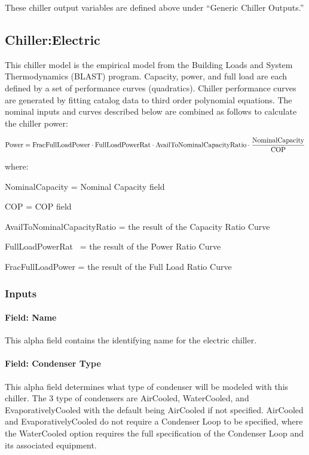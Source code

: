 These chiller output variables are defined above under ``Generic Chiller Outputs.''

\subsection{Chiller:Electric}\label{chillerelectric}

This chiller model is the empirical model from the Building Loads and System Thermodynamics (BLAST) program. Capacity, power, and full load are each defined by a set of performance curves (quadratics). Chiller performance curves are generated by fitting catalog data to third order polynomial equations. The nominal inputs and curves described below are combined as follows to calculate the chiller power:

\begin{equation}
{\rm{Power  =  FracFullLoadPower }}
    \cdot {\rm{ FullLoadPowerRat }}\cdot {\rm{ AvailToNominalCapacityRatio }}\cdot \frac{{{\rm{NominalCapacity}}}}{{{\rm{COP}}}}
\end{equation}

where:

NominalCapacity = Nominal Capacity field

COP = COP field

AvailToNominalCapacityRatio = the result of the Capacity Ratio Curve

FullLoadPowerRat~ = the result of the Power Ratio Curve

FracFullLoadPower = the result of the Full Load Ratio Curve

\subsubsection{Inputs}\label{inputs-3-026}

\paragraph{Field: Name}\label{field-name-3-023}

This alpha field contains the identifying name for the electric chiller.

\paragraph{Field: Condenser Type}\label{field-condenser-type-1-001}

This alpha field determines what type of condenser will be modeled with this chiller. The 3 type of condensers are AirCooled, WaterCooled, and EvaporativelyCooled with the default being AirCooled if not specified. AirCooled and EvaporativelyCooled do not require a Condenser Loop to be specified, where the WaterCooled option requires the full specification of the Condenser Loop and its associated equipment.

